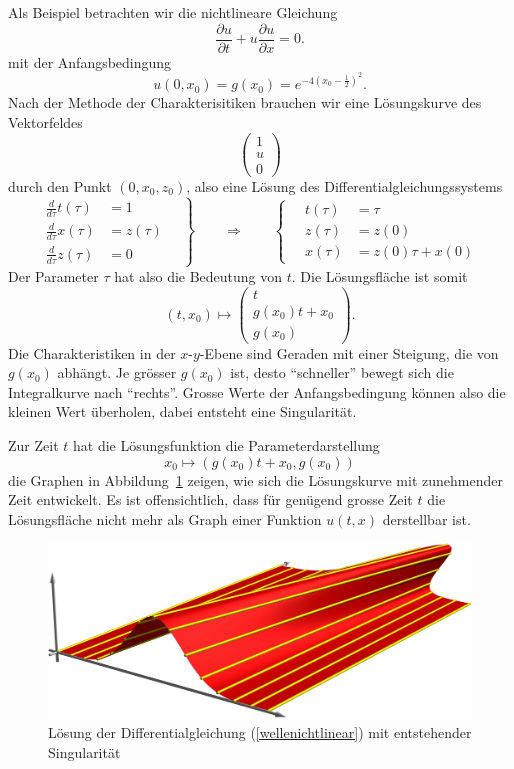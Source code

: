 Als Beispiel betrachten wir die nichtlineare Gleichung 
\begin{equation}
\frac{\partial u}{\partial t}+u\frac{\partial u}{\partial x}=0.
\label{wellenichtlinear}
\end{equation}
mit der Anfangsbedingung 
\[
u(0,x_0)=g(x_0)=e^{-4(x_0-\frac12)^2}.
\]
Nach der Methode der Charakterisitiken brauchen wir eine Lösungskurve
des Vektorfeldes
\[
\begin{pmatrix}
1\\
u\\
0
\end{pmatrix}
\]
durch den Punkt $(0,x_0, z_0)$, also eine Lösung des Differentialgleichungssystems
\[
\left.
\begin{aligned}
\frac{d}{d\tau} t(\tau)&=1\\
\frac{d}{d\tau} x(\tau)&=z(\tau)\\
\frac{d}{d\tau} z(\tau)&=0
\end{aligned}
\quad
\right\}
\qquad
\Rightarrow
\qquad
\left\{
\quad
\begin{aligned}
t(\tau)&=\tau\\
z(\tau)&=z(0)\\
x(\tau)&=z(0)\tau +x(0)
\end{aligned}
\right.
\]
Der Parameter $\tau$ hat also die Bedeutung von $t$.
Die Lösungsfläche ist somit
\[
(t,x_0)\mapsto
\begin{pmatrix}
t\\
g(x_0)t+x_0\\
g(x_0)
\end{pmatrix}.
\]
Die Charakteristiken in der $x$-$y$-Ebene sind Geraden mit einer
Steigung, die von $g(x_0)$ abhängt. Je grösser $g(x_0)$ ist, desto
``schneller'' bewegt sich die Integralkurve nach ``rechts''. Grosse
Werte der Anfangsbedingung können also die kleinen Wert überholen,
dabei entsteht eine Singularität.

Zur Zeit $t$ hat die Lösungsfunktion die Parameterdarstellung
\[
x_0\mapsto (g(x_0)t+x_0,g(x_0))
\]
die Graphen in Abbildung~\ref{g} zeigen, wie sich die Lösungskurve
mit zunehmender Zeit entwickelt.
Es ist offensichtlich, dass für genügend grosse Zeit $t$ die
Lösungsfläche nicht mehr als Graph einer Funktion $u(t,x)$ derstellbar ist.
\begin{figure}
\begin{center}
\includegraphics[width=\hsize]{graphics/welle.jpg}
\end{center}
\caption{Lösung der Differentialgleichung (\ref{wellenichtlinear}) mit
entstehender Singularität\label{g}}
\end{figure}

